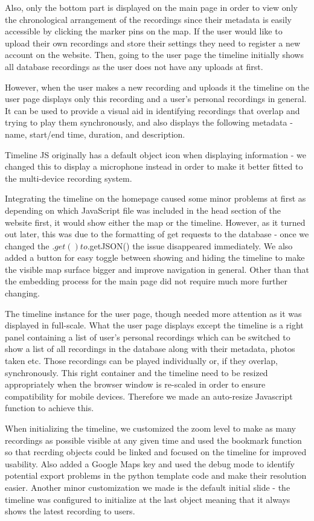 \documentclass{l3proj}
\begin{document}
Also, only the bottom part is displayed on the main page in order to view only the chronological arrangement of the recordings since their metadata is easily accessible by clicking the marker pins on the map.
If the user would like to upload their own recordings and store their settings they need to register a new account on the website.
Then, going to the user page the timeline initially shows all database recordings as the user does not have any uploads at first.

However, when the user makes a new recording and uploads it the timeline on the user page displays only this recording and a user's personal recordings in general.
It can be used to provide a visual aid in identifying recordings that overlap and trying to play them synchronously, and also displays the following metadata - name, start/end time, duration, and description.

Timeline JS originally has a default object icon when displaying information - we changed this to display a microphone instead in order to make it better fitted to the multi-device recording system.

Integrating the timeline on the homepage caused some minor problems at first as depending on which JavaScript file was included in the head section of the website first, it would show either the map or the timeline. However, as it turned out later, this was due to the formatting of get requests to the database - once we changed the $.get() to $.getJSON() the issue disappeared immediately. We also added a button for easy toggle between showing and hiding the timeline to make the visible map surface bigger and improve navigation in general.
Other than that the embedding process for the main page did not require much more further changing.

The timeline instance for the user page, though needed more attention as it was displayed in full-scale. What the user page displays except the timeline is a right panel containing a list of user's personal recordings which can be switched to show a list of all recordings in the database along with their metadata, photos taken etc.
Those recordings can be played individually or, if they overlap, synchronously. This right container and the timeline need to be resized appropriately when the browser window is re-scaled in order to ensure compatibility for mobile devices.
Therefore we made an auto-resize Javascript function to achieve this.

When initializing the timeline, we customized the zoom level to make as many recordings as possible visible at any given time and used the bookmark function so that recrding objects could be linked and focused on the timeline for improved usability.
Also added a Google Maps key and used the debug mode to identify potential export problems in the python template code and make their resolution easier. Another minor customization we made is the default initial slide - the timeline was configured to initialize at the last object meaning that it always shows the latest recording to users.
\end{document}
